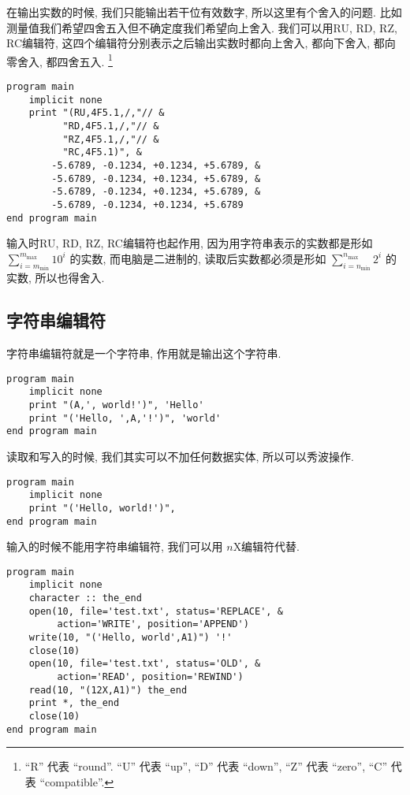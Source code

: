 在输出实数的时候, 我们只能输出若干位有效数字, 所以这里有个舍入的问题. 比如测量值我们希望四舍五入但不确定度我们希望向上舍入. 我们可以用RU, RD, RZ, RC编辑符, 这四个编辑符分别表示之后输出实数时都向上舍入, 都向下舍入, 都向零舍入, 都四舍五入. \footnote{``R'' 代表 ``round''.  ``U'' 代表 ``up'', ``D'' 代表 ``down'', ``Z'' 代表 ``zero'', ``C'' 代表 ``compatible''.}
\begin{lstlisting}
program main
    implicit none
    print "(RU,4F5.1,/,"// &
          "RD,4F5.1,/,"// &
          "RZ,4F5.1,/,"// &
          "RC,4F5.1)", &
        -5.6789, -0.1234, +0.1234, +5.6789, &
        -5.6789, -0.1234, +0.1234, +5.6789, &
        -5.6789, -0.1234, +0.1234, +5.6789, &
        -5.6789, -0.1234, +0.1234, +5.6789
end program main
\end{lstlisting}
输入时RU, RD, RZ, RC编辑符也起作用, 因为用字符串表示的实数都是形如 $ \sum_{i=m_\text{min}}^{m_\text{max}}10^{i} $ 的实数, 而电脑是二进制的, 读取后实数都必须是形如 $ \sum_{i=n_\text{min}}^{n_\text{max}}2^{i} $ 的实数, 所以也得舍入. 

\subsection{字符串编辑符}\label{character_string_edit_descriptor}

字符串编辑符就是一个字符串, 作用就是输出这个字符串. 
\begin{lstlisting}
program main
    implicit none
    print "(A,', world!')", 'Hello'
    print "('Hello, ',A,'!')", 'world'
end program main
\end{lstlisting}
读取和写入的时候, 我们其实可以不加任何数据实体, 所以可以秀波操作. 
\begin{lstlisting}
program main
    implicit none
    print "('Hello, world!')", 
end program main
\end{lstlisting}
输入的时候不能用字符串编辑符, 我们可以用 $ n $X编辑符代替. 
\begin{lstlisting}
program main
    implicit none
    character :: the_end
    open(10, file='test.txt', status='REPLACE', &
         action='WRITE', position='APPEND')
    write(10, "('Hello, world',A1)") '!'
    close(10)
    open(10, file='test.txt', status='OLD', &
         action='READ', position='REWIND')
    read(10, "(12X,A1)") the_end
    print *, the_end
    close(10)
end program main
\end{lstlisting}
